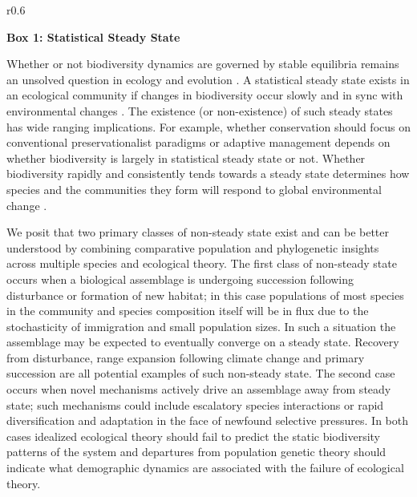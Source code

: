 \documentclass[11pt]{article}
\begin{document}
\begin{wrapfigure}[]{r}{0.6\textwidth}
\colorbox{gray!20}{
  \begin{minipage}{0.6\textwidth}
    \noindent    
    {\bf Box 1: Statistical Steady State}

    Whether or not biodiversity dynamics are governed by stable
    equilibria remains an unsolved question in ecology and evolution
    \citep{rabosky2015amNat, harmon2015amNat}. A
    statistical steady state exists in an ecological community if
    changes in biodiversity occur slowly and in sync with
    environmental changes \citep{harte2011}. The existence (or
    non-existence) of such steady states has wide ranging
    implications. For example, whether conservation should focus on
    conventional preservationalist paradigms or adaptive management
    \citep{levin1999} depends on whether biodiversity is largely in
    statistical steady state or not. Whether biodiversity rapidly and
    consistently tends towards a steady state determines how species
    and the communities they form will respond to global environmental
    change \citep{barnosky2012}.

    We posit that two primary classes of non-steady state exist and
    can be better understood by combining comparative population and
    phylogenetic insights across multiple species and ecological
    theory. The first class of non-steady state occurs when a
    biological assemblage is undergoing succession following
    disturbance or formation of new habitat; in this case populations
    of most species in the community and species composition itself
    will be in flux due to the stochasticity of immigration and small
    population sizes. In such a situation the assemblage may be
    expected to eventually converge on a steady state. Recovery from
    disturbance, range expansion following climate change and primary
    succession are all potential examples of such non-steady
    state. The second case occurs when novel mechanisms actively drive
    an assemblage away from steady state; such mechanisms could
    include escalatory species interactions or rapid diversification
    and adaptation in the face of newfound selective pressures. In
    both cases idealized ecological theory should fail to predict the
    static biodiversity patterns of the system and departures from
    population genetic theory should indicate what demographic
    dynamics are associated with the failure of ecological theory.
  \end{minipage}
}
\end{wrapfigure}
\end{document}
